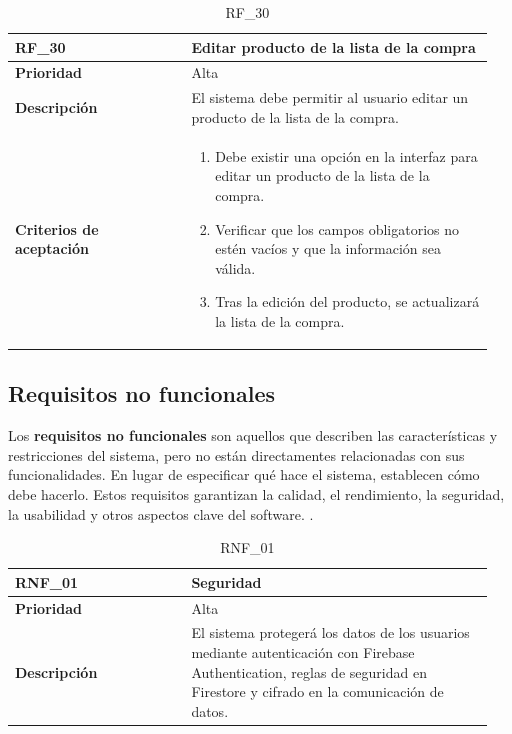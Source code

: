 \begin{table}[htb!]
    \begin{tabular}{|p{0.35\linewidth}|p{0.6\linewidth}|}
        \hline
        \rowcolor[HTML]{C0C0C0}  
        \textbf{RF\_30} & \textbf{Editar producto de la lista de la compra} \\ 
        \hline
        \textbf{Prioridad} & Alta \\ 
        \hline
        \textbf{Descripción} & El sistema debe permitir al usuario editar un producto de la lista de la compra. \\ 
        \hline
        \vspace{0.5mm}
        \textbf{Criterios de aceptación} & 
        \begin{minipage}[t]{0.9\linewidth}
            \begin{enumerate}
                \item Debe existir una opción en la interfaz para editar un producto de la lista de la compra.
                \item Verificar que los campos obligatorios no estén vacíos y que la información sea válida.
                \item Tras la edición del producto, se actualizará la lista de la compra.
            \end{enumerate}
            \vspace{2mm}
        \end{minipage} \\ 
        \hline
    \end{tabular}
    \caption{RF\_30}
    \label{req:RF30}
\end{table}


\clearpage

\subsection{Requisitos no funcionales}

Los \textbf{requisitos no funcionales} son aquellos que describen las características y restricciones del sistema, pero no están 
directamentes relacionadas con sus funcionalidades. En lugar de especificar qué hace el sistema, establecen cómo debe hacerlo.
Estos requisitos garantizan la calidad, el rendimiento, la seguridad, la usabilidad y otros aspectos clave del software. \cite{sommerville2015}.

\begin{table}[htb!]
    \begin{tabular}{|p{0.35\linewidth}|p{0.6\linewidth}|}
        \hline
        \rowcolor[HTML]{C0C0C0}
        \textbf{RNF\_01} & \textbf{Seguridad} \\
        \hline
        \textbf{Prioridad} & Alta \\
        \hline
        \textbf{Descripción} & 
        El sistema protegerá los datos de los usuarios mediante autenticación con Firebase Authentication, 
        reglas de seguridad en Firestore y cifrado en la comunicación de datos. \\
        \hline
    \end{tabular}
    \caption{RNF\_01}
\end{table}


